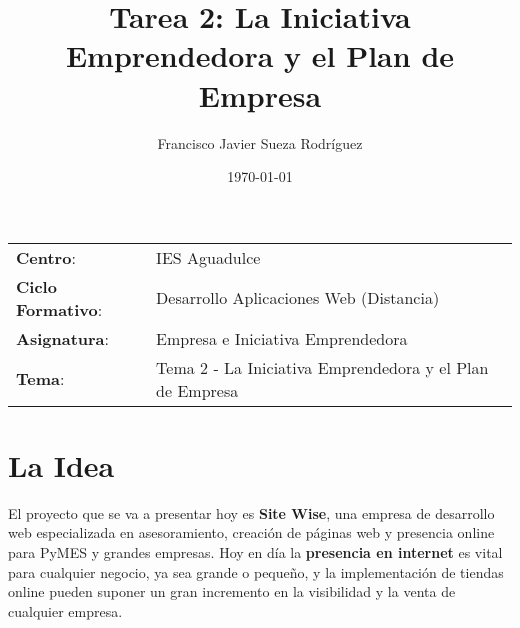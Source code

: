 


\title{
\vspace{10ex}
\normalfont \normalsize
\huge \textbf{Tarea 2: La Iniciativa Emprendedora y el Plan de Empresa}
}
\author{Francisco Javier Sueza Rodríguez}
\date{\normalsize\today}



\maketitle

\thispagestyle{empty}

\vspace{65ex}

\begin{center}
    \begin{tabular}{l l}
        \textbf{Centro}: & IES Aguadulce \\
        \textbf{Ciclo Formativo}: & Desarrollo Aplicaciones Web (Distancia)\\
        \textbf{Asignatura}: & Empresa e Iniciativa Emprendedora\\
        \textbf{Tema}: & Tema 2 -  La Iniciativa Emprendedora y el Plan de Empresa\\
    \end{tabular}
\end{center}

\newpage

\section{La Idea}
El proyecto que se va a presentar hoy es \textbf{Site Wise}, una empresa de desarrollo web especializada en asesoramiento, creación de páginas web y presencia online para PyMES y grandes empresas. Hoy en día la \textbf{presencia en internet} es vital para cualquier negocio, ya sea grande o pequeño, y la implementación de tiendas online pueden suponer un gran incremento en la visibilidad y la venta de cualquier empresa.

